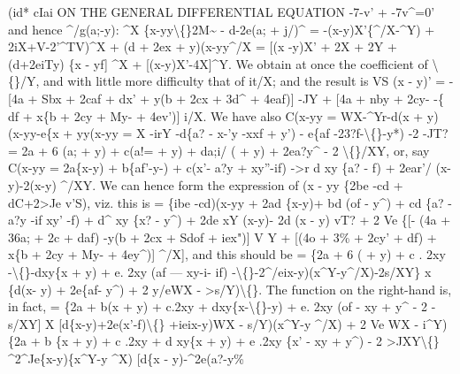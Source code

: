 \documentclass[11pt,a4paper]{book}
\begin{document}
(id*
cIai
ON THE GENERAL DIFFERENTIAL EQUATION
-7-v' + -7v\textasciicircum{}=0'
and hence
\textasciicircum{}/g(a;-y)\textbullet{}:
\textasciicircum{}X \{x-yy\textbackslash\{\}2M\textasciitilde{} - d-2e(a; + j/)\textasciicircum{}
= -(x-y)X'\{\textasciicircum{}/X-\textasciicircum{}Y) + 2iX+V-2'\textasciicircum{}TV)\textasciicircum{}X
+ (d + 2ex + y)(x-yy\textasciicircum{}/X
=
[(x -y)X' + 2X + 2Y + (d+2eiTy) \{x - yf] \textasciicircum{}X
+ [(x-y)X'-4X]\textasciicircum{}Y.
We
obtain
at
once
the
coefficient
of
\textbackslash\{\}/Y, and
with
little
more
difficulty
that
of
it/X;
and the
result
is
VS (x - y)' = - [4a + Sbx + 2caf + dx' + y(b + 2cx + 3d\textasciicircum{} + 4eaf)] -JY
+ [4a + nby + 2cy- -\{ df + x\{b + 2cy + My- + 4ev')] i/X.
We have
also
C(x-yy = WX-\textasciicircum{}Yr-d(x + y)(x-yy-e\{x + yy(x-yy
= X -irY -d\{a? - x-'y -xxf + y') - e\{af -23?f-\textbackslash\{\}-y*) -2 -JT?
= 2a + 6 (a; + y) + c(a!= + y\guillemotright{}) + da;i/ (\guillemotleft{} + y) + 2ea?y\textasciicircum{} - 2 \textbackslash\{\}/XY,
or, say
C(x-yy = 2a\{x-y) + b\{af'-y-) + c(x'- a?y + xy''-if)
->r d xy \{a? - f)
+ 2ear'\guillemotleft{}/\guillemotright{} (x-y)-2(x-y) \textasciicircum{}/XY.
We can hence form
the expression of
(x - yy \{2be -cd + dC+2>Je v'S),
viz.
this
is
= \{ibe -cd)(x-yy + 2ad \{x-y)+ bd (of - y\textasciicircum{}) + cd \{a? - a?y -if xy' -f) + d\textasciicircum{} xy \{x? - y\textasciicircum{})
+ 2de xY (x-y)- 2d (x - y) vT?
+ 2 Ve \{[- (4a + 36a; + 2c\guillemotleft{}\guillemotright{} + daf) -y(b + 2cx + Sdof + iex")] V Y
+ [(4o + 3\% + 2cy' + df) + x\{b + 2cy + My- + 4ey\textasciicircum{})] \textasciicircum{}/X],
and
this should be
= \{2a + 6 (\guillemotleft{} + y) + c
. 2xy -\textbackslash\{\}-dxy\{x + y) + e. 2xy (af --- xy-i- if)
-\textbackslash\{\}-2\textasciicircum{}/eix-y)(x\textasciicircum{}Y-y\textasciicircum{}/X)-2s/XY\} x \{d(x- y) + 2e\{af- y\textasciicircum{}) + 2 y/eWX - >s/Y)\textbackslash\{\}.
The function on the right-hand
is, in
fact,
= \{2a + b(x + y) + c.2xy + dxy\{x-\textbackslash\{\}-y) + e. 2xy (of - xy + y\textasciicircum{} - 2 -s/XY]
X [d\{x-y)+2e(x'-f)\textbackslash\{\} +ieix-y)WX - s/Y)(x\textasciicircum{}Y-y \textasciicircum{}/X)
+ 2 Ve WX - i\textasciicircum{}Y) \{2a + b \{x + y) + c .2xy + d xy\{x + y) + e .2xy \{x' - xy + y\textasciicircum{}) - 2 >JXY\textbackslash\{\}
\textasciicircum{}2\textasciicircum{}Je\{x-y)\{x\textasciicircum{}Y-y \textasciicircum{}X) [d\{x - y)-\textasciicircum{}2e(a?-y\%
\end{document}
